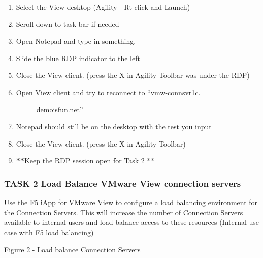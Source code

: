 \documentclass[letterpaper,10pt,english]{sphinxmanual}
\begin{document}
\begin{enumerate}
\item {} 
Select the View desktop (Agility—Rt click and Launch)

\item {} 
Scroll down to task bar if needed

\item {} 
Open Notepad and type in something.

\item {} 
Slide the blue RDP indicator to the left

\item {} 
Close the View client. (press the X in Agility Toolbar-was under the
RDP)

\item {} \begin{description}
\item[{Open View client and try to reconnect to “vmw-connsvr1c.}] \leavevmode
demoisfun.net”

\end{description}

\item {} 
Notepad should still be on the desktop with the test you input

\item {} 
Close the View client. (press the X in Agility Toolbar)

\item {} 
{\color{red}\bfseries{}**}Keep the RDP session open for Task 2 **

\end{enumerate}


\subsubsection{TASK 2 \textendash{} Load Balance VMware View connection servers}
\label{\detokenize{class2/module1/lab1:task-2-load-balance-vmware-view-connection-servers}}
Use the F5 iApp for VMware View to configure a load balancing
environment for the Connection Servers. This will increase the number of
Connection Servers available to internal users and load balance access
to these resources (Internal use case with F5 load balancing)


Figure 2 - Load balance Connection Servers
\end{document}
